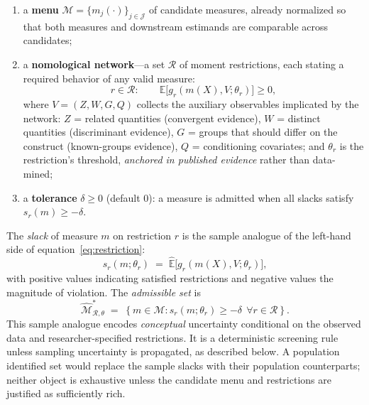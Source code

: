 \documentclass[11pt,letterpaper]{article}
\begin{document}
\begin{enumerate}[leftmargin=1.5em]
  \item a \textbf{menu} $\mathcal{M} = \{m_j(\cdot)\}_{j \in \mathcal{J}}$ of candidate measures, already normalized so that both measures and downstream estimands are comparable across candidates;
  \item a \textbf{nomological network}---a set $\mathcal{R}$ of moment restrictions, each stating a required behavior of any valid measure:
  \begin{equation}
    r \in \mathcal{R}: \qquad \mathbb{E}\bigl[g_r(m(X), V; \theta_r)\bigr] \ge 0,
    \label{eq:restriction}
  \end{equation}
  where $V = (Z, W, G, Q)$ collects the auxiliary observables implicated by the network: $Z$ = related quantities (convergent evidence), $W$ = distinct quantities (discriminant evidence), $G$ = groups that should differ on the construct (known-groups evidence), $Q$ = conditioning covariates; and $\theta_r$ is the restriction's threshold, \emph{anchored in published evidence} rather than data-mined;
  \item a \textbf{tolerance} $\delta \ge 0$ (default $0$): a measure is admitted when all slacks satisfy $s_r(m) \ge -\delta$.
\end{enumerate}

The \emph{slack} of measure $m$ on restriction $r$ is the sample analogue of the left-hand side of equation~\eqref{eq:restriction}:
\begin{equation}
  s_r(m; \theta_r) \;=\; \widehat{\mathbb{E}}\bigl[g_r(m(X), V; \theta_r)\bigr],
\end{equation}
with positive values indicating satisfied restrictions and negative values the magnitude of violation. The \emph{admissible set} is
\begin{equation}
  \widehat{\mathcal{M}}^{*}_{\mathcal{R},\theta} \;=\; \left\{ m \in \mathcal{M} : s_r(m;\theta_r) \ge -\delta \ \ \forall r \in \mathcal{R} \right\}.
  \label{eq:admissible}
\end{equation}
This sample analogue encodes \emph{conceptual} uncertainty conditional on the observed data and researcher-specified restrictions. It is a deterministic screening rule unless sampling uncertainty is propagated, as described below. A population identified set would replace the sample slacks with their population counterparts; neither object is exhaustive unless the candidate menu and restrictions are justified as sufficiently rich.
\end{document}
